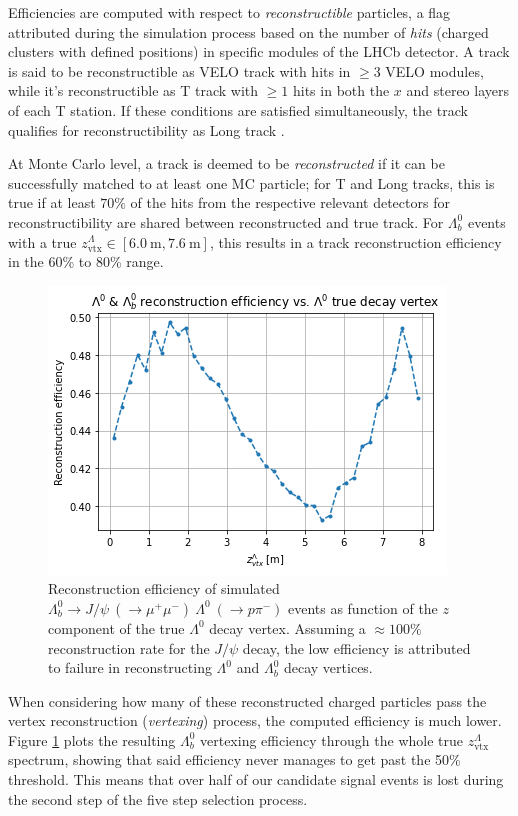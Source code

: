 Efficiencies are computed with respect to \textit{reconstructible} particles, a flag attributed during the simulation process based on the number of \textit{hits} (charged clusters with defined positions) in specific modules of the LHCb detector.
A track is said to be reconstructible as VELO track with hits in $\geq 3$ VELO modules, while it's reconstructible as T track with $\geq 1$ hits in both the $x$ and stereo layers of each T station.
If these conditions are satisfied simultaneously, the track qualifies for reconstructibility as Long track \cite{Li:2752971}.

At Monte Carlo level, a track is deemed to be \textit{reconstructed} if it can be successfully matched to at least one MC particle;
for T and Long tracks, this is true if at least $70\%$ of the hits from the respective relevant detectors for reconstructibility are shared between reconstructed and true track. For $\Lambda^0_b$ events with a true $z_\text{vtx}^\Lambda \in [\SI{6.0}{\meter}, \SI{7.6}{\meter}]$, this results in a track reconstruction efficiency in the 60\% to 80\% range.

\begin{figure}[t!]
	\centering
	\includegraphics[width=.6\textwidth]{graphics/03-vertex_reconstruction/lambda_lambdab_reco_efficiency.png}
	\caption[A]{Reconstruction efficiency of simulated $\Lambda^0_b \rightarrow J/\psi~(\rightarrow \mu^+\mu^-)~\Lambda^0~(\rightarrow p\pi^-)$ events as function of the $z$ component of the true $\Lambda^0$ decay vertex. Assuming a $\approx 100\%$ reconstruction rate for the $J/\psi$ decay, the low efficiency is attributed to failure in reconstructing $\Lambda^0$ and $\Lambda^0_b$ decay vertices.}
	\label{fig:lambda_lambdab_reco_efficiency}
\end{figure}

When considering how many of these reconstructed charged particles pass the vertex reconstruction (\textit{vertexing}) process, the computed efficiency is much lower.
Figure \ref{fig:lambda_lambdab_reco_efficiency} plots the resulting $\Lambda_b^0$ vertexing efficiency through the whole true $z_\text{vtx}^\Lambda$ spectrum, showing that said efficiency never manages to get past the 50\% threshold.
This means that over half of our candidate signal events is lost during the second step of the five step selection process.

